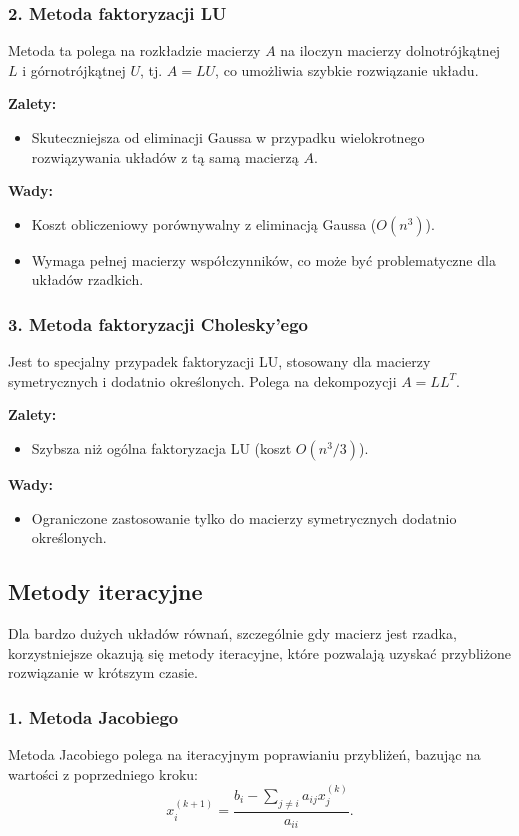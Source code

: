 \subsubsection{2. Metoda faktoryzacji LU}
Metoda ta polega na rozkładzie macierzy \( A \) na iloczyn macierzy dolnotrójkątnej \( L \) i górnotrójkątnej \( U \), tj. \( A = LU \), co umożliwia szybkie rozwiązanie układu.

\textbf{Zalety:}
\begin{itemize}
    \item Skuteczniejsza od eliminacji Gaussa w przypadku wielokrotnego rozwiązywania układów z tą samą macierzą \( A \).
\end{itemize}

\textbf{Wady:}
\begin{itemize}
    \item Koszt obliczeniowy porównywalny z eliminacją Gaussa (\( O(n^3) \)).
    \item Wymaga pełnej macierzy współczynników, co może być problematyczne dla układów rzadkich.
\end{itemize}

\subsubsection{3. Metoda faktoryzacji Cholesky’ego}
Jest to specjalny przypadek faktoryzacji LU, stosowany dla macierzy symetrycznych i dodatnio określonych. Polega na dekompozycji \( A = LL^T \).

\textbf{Zalety:}
\begin{itemize}
    \item Szybsza niż ogólna faktoryzacja LU (koszt \( O(n^3/3) \)).
\end{itemize}

\textbf{Wady:}
\begin{itemize}
    \item Ograniczone zastosowanie tylko do macierzy symetrycznych dodatnio określonych.
\end{itemize}

\subsection{Metody iteracyjne}
Dla bardzo dużych układów równań, szczególnie gdy macierz jest rzadka, korzystniejsze okazują się metody iteracyjne, które pozwalają uzyskać przybliżone rozwiązanie w krótszym czasie.

\subsubsection{1. Metoda Jacobiego}
Metoda Jacobiego polega na iteracyjnym poprawianiu przybliżeń, bazując na wartości z poprzedniego kroku:
\[
x_i^{(k+1)} = \frac{b_i - \sum_{j \neq i} a_{ij} x_j^{(k)}}{a_{ii}}.
\]

